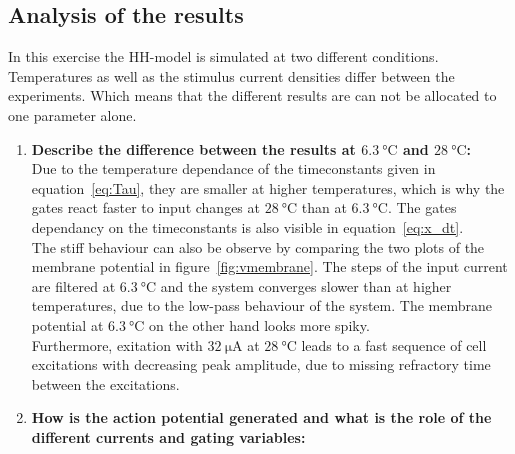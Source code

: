 \documentclass{scrartcl}			%
\begin{document}
\subsection{Analysis of the results}
In this exercise the HH-model is simulated at two different conditions. Temperatures as well as the stimulus current densities differ between the experiments.
Which means that the different results are can not be allocated to one parameter alone.

\begin{enumerate}
\item \textbf{Describe the difference between the results at $\SI{6.3}{\celsius}$ and $\SI{28}{\celsius}$:}\\

Due to the temperature dependance of the timeconstants given in equation~\ref{eq:Tau}, they are smaller at higher temperatures, which is why the gates react faster to input changes at $\SI{28}{\celsius}$ than at $\SI{6.3}{\celsius}$. The gates dependancy on the timeconstants is also visible in equation~\ref{eq:x_dt}.\\
The stiff behaviour can also be observe by comparing the two plots of the membrane potential in figure~\ref{fig:vmembrane}.
The steps of the input current are filtered at $\SI{6.3}{\celsius}$ and the system converges slower than at higher temperatures, due to the low-pass behaviour of the system. The membrane potential at $\SI{6.3}{\celsius}$ on the other hand looks more spiky.\\
Furthermore, exitation with $\SI{32}{\micro\ampere}$ at $\SI{28}{\celsius}$ leads to a fast sequence of cell excitations with decreasing peak amplitude, due to missing refractory time between the excitations. 

\item \textbf{How is the action potential generated and what is the role of the different currents and gating variables:}\\


\end{enumerate}
\end{document}
